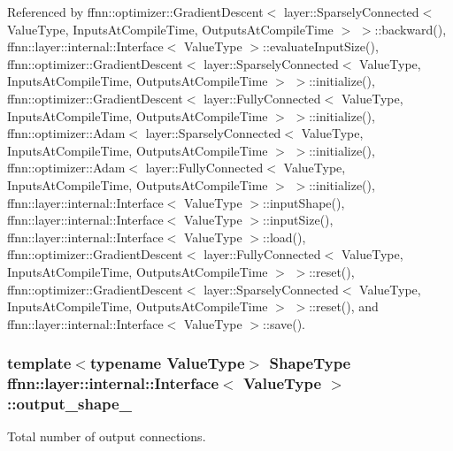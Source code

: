 Referenced by ffnn\-::optimizer\-::\-Gradient\-Descent$<$ layer\-::\-Sparsely\-Connected$<$ Value\-Type, Inputs\-At\-Compile\-Time, Outputs\-At\-Compile\-Time $>$ $>$\-::backward(), ffnn\-::layer\-::internal\-::\-Interface$<$ Value\-Type $>$\-::evaluate\-Input\-Size(), ffnn\-::optimizer\-::\-Gradient\-Descent$<$ layer\-::\-Sparsely\-Connected$<$ Value\-Type, Inputs\-At\-Compile\-Time, Outputs\-At\-Compile\-Time $>$ $>$\-::initialize(), ffnn\-::optimizer\-::\-Gradient\-Descent$<$ layer\-::\-Fully\-Connected$<$ Value\-Type, Inputs\-At\-Compile\-Time, Outputs\-At\-Compile\-Time $>$ $>$\-::initialize(), ffnn\-::optimizer\-::\-Adam$<$ layer\-::\-Sparsely\-Connected$<$ Value\-Type, Inputs\-At\-Compile\-Time, Outputs\-At\-Compile\-Time $>$ $>$\-::initialize(), ffnn\-::optimizer\-::\-Adam$<$ layer\-::\-Fully\-Connected$<$ Value\-Type, Inputs\-At\-Compile\-Time, Outputs\-At\-Compile\-Time $>$ $>$\-::initialize(), ffnn\-::layer\-::internal\-::\-Interface$<$ Value\-Type $>$\-::input\-Shape(), ffnn\-::layer\-::internal\-::\-Interface$<$ Value\-Type $>$\-::input\-Size(), ffnn\-::layer\-::internal\-::\-Interface$<$ Value\-Type $>$\-::load(), ffnn\-::optimizer\-::\-Gradient\-Descent$<$ layer\-::\-Fully\-Connected$<$ Value\-Type, Inputs\-At\-Compile\-Time, Outputs\-At\-Compile\-Time $>$ $>$\-::reset(), ffnn\-::optimizer\-::\-Gradient\-Descent$<$ layer\-::\-Sparsely\-Connected$<$ Value\-Type, Inputs\-At\-Compile\-Time, Outputs\-At\-Compile\-Time $>$ $>$\-::reset(), and ffnn\-::layer\-::internal\-::\-Interface$<$ Value\-Type $>$\-::save().

\hypertarget{classffnn_1_1layer_1_1internal_1_1_interface_aac8cae47508ba37964d11754e181813a}{
\subsubsection[{output\-\_\-shape\-\_\-}]{\setlength{\rightskip}{0pt plus 5cm}template$<$typename Value\-Type$>$ {\bf Shape\-Type} {\bf ffnn\-::layer\-::internal\-::\-Interface}$<$ Value\-Type $>$\-::output\-\_\-shape\-\_\-\hspace{0.3cm}{\ttfamily [protected]}}}\label{classffnn_1_1layer_1_1internal_1_1_interface_aac8cae47508ba37964d11754e181813a}


Total number of output connections. 



